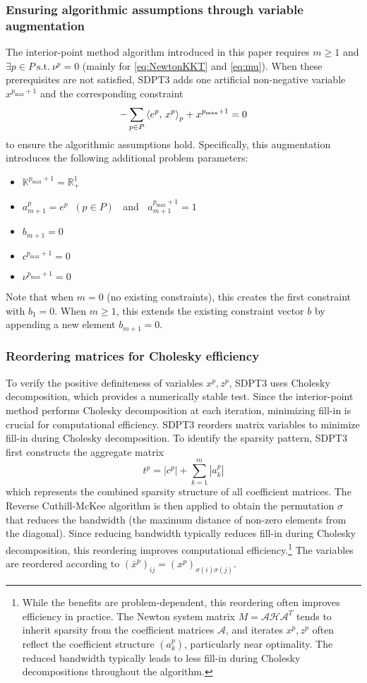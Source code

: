 \subsubsection{Ensuring algorithmic assumptions through variable augmentation}
The interior-point method algorithm introduced in this paper requires $m \geq 1$ and $\exists p\in P ~ \text{s.t.} ~ \nu^p=0$ (mainly for \eqref{eq:NewtonKKT} and \eqref{eq:mu}).
When these prerequisites are not satisfied, SDPT3 adds one artificial non-negative variable $x^{p_{\max} + 1}$ and the corresponding constraint
\[
  -\sum_{p\in P} \left\langle e^p, \, x^p \right\rangle_p + x^{p_{\max} + 1} = 0
\]
to ensure the algorithmic assumptions hold.
Specifically, this augmentation introduces the following additional problem parameters:
\begin{itemize}
    \item $\mathbb{K}^{p_{\max} + 1} = \mathbb{R}^1_+$
    \item $a^{p}_{m+1}=e^p \;\; (p \in P) \;\;$ and $\;\; a^{p_{\max} + 1}_{m+1} = 1$
    \item $b_{m+1} = 0$
    \item $c^{p_{\max} +1}=0$
    \item $\nu^{p_{\max} + 1} = 0$
\end{itemize}
Note that when $m = 0$ (no existing constraints), this creates the first constraint with $b_1 = 0$. When $m \geq 1$, this extends the existing constraint vector $b$ by appending a new element $b_{m+1} = 0$.


\subsubsection{Reordering matrices for Cholesky efficiency}
To verify the positive definiteness of variables $x^p, z^p$, SDPT3 uses Cholesky decomposition, which provides a numerically stable test.
Since the interior-point method performs Cholesky decomposition at each iteration, minimizing fill-in is crucial for computational efficiency.
SDPT3 reorders matrix variables to minimize fill-in during Cholesky decomposition.
To identify the sparsity pattern, SDPT3 first constructs the aggregate matrix
\[
  t^p = |c^p| + \sum_{k=1}^m |a^p_k|
\]
which represents the combined sparsity structure of all coefficient matrices.
The Reverse Cuthill-McKee algorithm is then applied to obtain the permutation $\sigma$ that reduces the bandwidth (the maximum distance of non-zero elements from the diagonal).
Since reducing bandwidth typically reduces fill-in during Cholesky decomposition, this reordering improves computational efficiency.\footnote{
  While the benefits are problem-dependent, this reordering often improves efficiency in practice. 
  The Newton system matrix $M = \mathcal{A}\mathcal{H}\mathcal{A}^T$ tends to inherit sparsity from the coefficient matrices $\mathcal{A}$, and iterates $x^p, z^p$ often reflect the coefficient structure $(a_k^p)$, particularly near optimality. 
  The reduced bandwidth typically leads to less fill-in during Cholesky decompositions throughout the algorithm.}
The variables are reordered according to $(\bar{x}^p)_{ij} = (x^p)_{\sigma(i)\sigma(j)}$.

